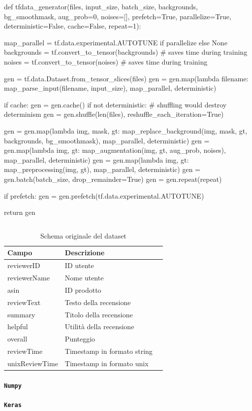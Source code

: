 \begin{python}

def tfdata_generator(files, input_size, batch_size, backgrounds, 
					 bg_smoothmask, aug_prob=0, noises=[],
					 prefetch=True, parallelize=True, 
					 deterministic=False, cache=False, repeat=1):

	map_parallel = tf.data.experimental.AUTOTUNE if parallelize else None
	backgrounds = tf.convert_to_tensor(backgrounds) # saves time during training
	noises = tf.convert_to_tensor(noises) # saves time during training

	gen = tf.data.Dataset.from_tensor_slices(files)
	gen = gen.map(lambda filename: map_parse_input(filename, input_size), map_parallel, deterministic)
	
	if cache:
		gen = gen.cache()
		if not deterministic: # shuffling would destroy determinism
			gen = gen.shuffle(len(files), reshuffle_each_iteration=True)
	
	gen = gen.map(lambda img, mask, gt: map_replace_background(img, mask, gt, backgrounds, bg_smoothmask), map_parallel, deterministic)
	gen = gen.map(lambda img, gt: map_augmentation(img, gt, aug_prob, noises), map_parallel, deterministic)
	gen = gen.map(lambda img, gt: map_preprocessing(img, gt), map_parallel, deterministic)
	gen = gen.batch(batch_size, drop_remainder=True)
	gen = gen.repeat(repeat)
	
	if prefetch:
		gen = gen.prefetch(tf.data.experimental.AUTOTUNE)
	
	return gen
\end{python}

\begin{lstlisting}[frame=none,caption={Protocol used by the manual controller 
to decide, for each robot, the message to transmit and the colour.}, 
label=lst:manualtask2]
\end{lstlisting}


\begin{table}[H]
	\caption{Schema originale del dataset}\label{tab:df-schema}
	\centering
	\begin{tabular}{|l|l|l|}
		\hline
		Campo & Descrizione \\
		\hline
		reviewerID & ID utente \\
		reviewerName & Nome utente \\
		asin & ID prodotto \\
		reviewText & Testo della recensione \\
		summary & Titolo della recensione \\
		helpful & Utilità della recensione \\
		overall & Punteggio \\
		reviewTime & Timestamp in formato string \\
		unixReviewTime & Timestamp in formato unix \\
		\hline
	\end{tabular}
\end{table}


\paragraph*{\texttt{Numpy}}
\lipsum[1]


\paragraph*{\texttt{Keras}}
\lipsum[1]